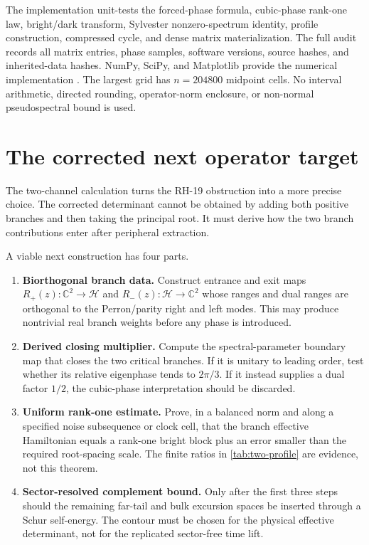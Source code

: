 \documentclass[11pt]{article}
\theoremstyle{definition}
\theoremstyle{remark}
\newcommand{\C}{\mathbb C}
\newcommand{\cH}{\mathcal H}
\begin{document}
The implementation unit-tests the forced-phase formula, cubic-phase
rank-one law, bright/dark transform, Sylvester nonzero-spectrum identity,
profile construction, compressed cycle, and dense matrix materialization.
The full audit records all matrix entries, phase samples, software versions,
source hashes, and inherited-data hashes.  NumPy, SciPy, and Matplotlib
provide the numerical implementation
\citep{HarrisEtAl2020,VirtanenEtAl2020,Hunter2007}.  The largest grid has
$n=204800$ midpoint cells.  No interval arithmetic, directed rounding,
operator-norm enclosure, or non-normal pseudospectral bound is used.

\section{The corrected next operator target}
\label{sec:next-target}

The two-channel calculation turns the RH-19 obstruction into a more precise
choice.  The corrected determinant cannot be obtained by adding both
positive branches and then taking the principal root.  It must derive how
the two branch contributions enter after peripheral extraction.

A viable next construction has four parts.
\begin{enumerate}[label=\textbf{G\arabic*.},leftmargin=3.1em]
 \item \textbf{Biorthogonal branch data.}
 Construct entrance and exit maps
 $R_+(z):\C^2\to\cH$ and $R_-(z):\cH\to\C^2$ whose ranges and dual ranges
 are orthogonal to the Perron/parity right and left modes.  This may produce
 nontrivial real branch weights before any phase is introduced.

 \item \textbf{Derived closing multiplier.}
 Compute the spectral-parameter boundary map that closes the two critical
 branches.  If it is unitary to leading order, test whether its relative
 eigenphase tends to $2\pi/3$.  If it instead supplies a dual factor $1/2$,
 the cubic-phase interpretation should be discarded.

 \item \textbf{Uniform rank-one estimate.}
 Prove, in a balanced norm and along a specified noise subsequence or clock
 cell, that the branch effective Hamiltonian equals a rank-one bright block
 plus an error smaller than the required root-spacing scale.  The finite
 ratios in \cref{tab:two-profile} are evidence, not this theorem.

 \item \textbf{Sector-resolved complement bound.}
 Only after the first three steps should the remaining far-tail and bulk
 excursion spaces be inserted through a Schur self-energy.  The contour must
 be chosen for the physical effective determinant, not for the replicated
 sector-free time lift.
\end{enumerate}
\end{document}
